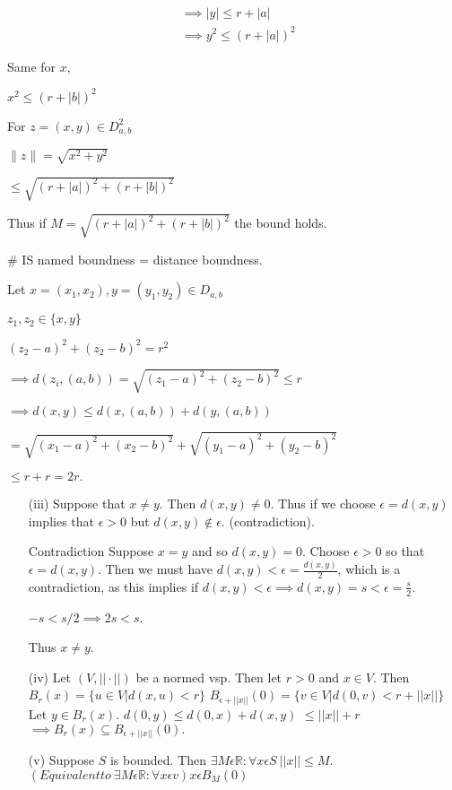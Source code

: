 \documentclass{article}
\theoremstyle{definition}
\numberwithin{equation}{section}
\begin{document}
\begin{align*}
&\implies |y| \leq r + |a| \\
&\implies y^2 \leq (r+|a|)^2
\end{align*}

Same for $x$, 

$ x^2 \leq (r + |b|)^2 $

For $z = (x,y) \in D^2_{a,b}$

$ \| z \| = \sqrt{x^2 + y^2} $

$
\leq \sqrt{(r + |a|)^2 + (r + |b|)^2}
$

Thus if 
$
M = \sqrt{(r + |a|)^2 + (r + |b|)^2}
$
the bound holds.

\# IS named boundness = distance boundness.

Let \( x = (x_1, x_2), y = (y_1, y_2) \in D_{a,b} \)

$ z_1, z_2 \in \{x,y\} $

$
(z_2 - a)^2 + (z_2 - b)^2 = r^2
$

$
\implies d(z_i, (a, b)) = \sqrt{(z_1 - a)^2 + (z_2 - b)^2} \leq r 
$

$
\implies d(x,y) \leq d(x, (a,b)) + d(y, (a,b))
$

$
= \sqrt{(x_1 - a)^2 + (x_2 - b)^2} + \sqrt{(y_1 - a)^2 + (y_2 - b)^2}
$

$
\leq r + r = 2r.
$

\begin{enumerate}
    \item[(iii)] Suppose that \( x \neq y \). Then \( d(x,y) \neq 0 \). Thus if we choose \(\epsilon = d(x,y)\) implies that \( \epsilon > 0 \) but \( d(x,y) \notin \epsilon \). (contradiction).

    \item[Contradiction] Suppose \( x = y \) and so \( d(x,y) = 0 \). Choose \(\epsilon > 0 \) so that \(\epsilon = d(x,y) \). Then we must have \( d(x,y) < \epsilon = \frac{d(x,y)}{2} \), which is a contradiction, as this implies if \( d(x,y) < \epsilon \implies d(x,y) = s < \epsilon = \frac{s}{2} \).

    \(-s < s/2 \implies 2s < s \).

    Thus \( x \neq y \).

    \item[(iv)] Let \( (V, || \cdot || )\) be a normed vsp. Then let \( r > 0 \) and \( x \in V \). Then
    $
    B_{r}(x) = \{ u \in V | d(x,u) < r \}
    $
    $
    B_{\epsilon + ||x||}(0) = \{ v \in V | d(0,v) < r + ||x|| \}
    $
    $
    \text{Let } y \in B_r(x). 
    $
    $
    d(0,y) \leq d(0,x) + d(x,y)
    $
    $
    \leq ||x|| + r
    $
    $
    \implies B_r(x) \subseteq B_{\epsilon + ||x||}(0).
    $

    \item[(v)] Suppose \( S \) is bounded. Then \(\exists M \epsilon \mathbb{R}: \forall x \epsilon S \ ||x|| \leq M \).
    $
    (Equivalent to\ \exists M \epsilon \mathbb{R}: \forall x \epsilon v) x \epsilon B_{M}(0)
    $
\end{enumerate}
\end{document}
